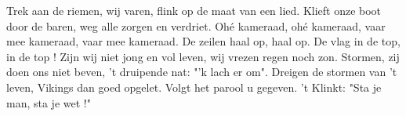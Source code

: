 \beginverse*
Trek aan de riemen, wij varen,
flink op de maat van een lied.
Klieft onze boot door de baren,
weg alle zorgen en verdriet.
\endverse
\beginchorus
Ohé kameraad, ohé kameraad,
vaar mee kameraad, vaar mee kameraad.
De zeilen haal op, haal op.
De vlag in de top, in de top ! 
\endchorus
\beginverse*
Zijn wij niet jong en vol leven,
wij vrezen regen noch zon.
Stormen, zij doen ons niet beven,
't druipende nat: "'k lach er om".
\endverse
\beginverse*
Dreigen de stormen van 't leven,
Vikings dan goed opgelet.
Volgt het parool u gegeven.
't Klinkt: "Sta je man, sta je wet !"
\endverse
\endsong